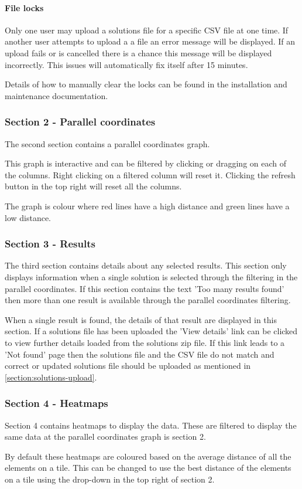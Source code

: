 \paragraph{File locks}  Only one user may upload a solutions file for a specific CSV file at one time.  If another user attempts to upload a a file an error message will be displayed.  If an upload fails or is cancelled there is a chance this message will be displayed incorrectly.  This issues will automatically fix itself after 15 minutes.

Details of how to manually clear the locks can be found in the installation and maintenance documentation.

\subsubsection{Section 2 - Parallel coordinates}

The second section contains a parallel coordinates graph.

This graph is interactive and can be filtered by clicking or dragging on each of the columns.  Right clicking on a filtered column will reset it.  Clicking the refresh button in the top right will reset all the columns.

The graph is colour where red lines have a high distance and green lines have a low distance.

\subsubsection{Section 3 - Results}

The third section contains details about any selected results.  This section only displays information when a single solution is selected through the filtering in the parallel coordinates.  If this section contains the text 'Too many results found' then more than one result is available through the parallel coordinates filtering.

When a single result is found, the details of that result are displayed in this section.  If a solutions file has been uploaded the 'View details' link can be clicked to view further details loaded from the solutions zip file.  If this link leads to a 'Not found' page then the solutions file and the CSV file do not match and correct or updated solutions file should be uploaded as mentioned in \ref{section:solutions-upload}.

\subsubsection{Section 4 - Heatmaps}

Section 4 contains heatmaps to display the data.  These are filtered to display the same data at the parallel coordinates graph is section 2.

By default these heatmaps are coloured based on the average distance of all the elements on a tile.  This can be changed to use the best distance of the elements on a tile using the drop-down in the top right of section 2.
